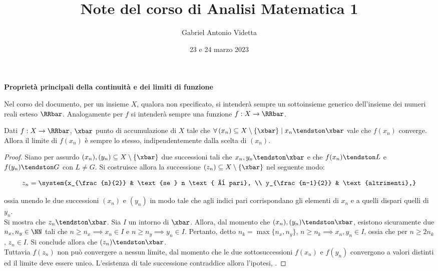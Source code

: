 \documentclass[11pt]{article}
\title{\textbf{Note del corso di Analisi Matematica 1}}
\author{Gabriel Antonio Videtta}
\date{23 e 24 marzo 2023}
\begin{document}
	
	\maketitle
	
	\begin{center}
		\Large \textbf{Proprietà principali della continuità e dei limiti di funzione}
	\end{center}
	
	\begin{note} Nel corso del documento, per un insieme $X$, qualora non
		specificato, si intenderà sempre un sottoinsieme generico dell'insieme
		dei numeri reali esteso $\RRbar$. Analogamente per $f$ si intenderà
		sempre una funzione $f : X \to \RRbar$.
	\end{note}
	
	\begin{proposition}
		Dati $f : X \to \RRbar$, $\xbar$ punto di accumulazione di $X$
		tale che $\forall \, (x_n) \subseteq X \setminus \{\xbar\} \mid x_n \tendston \xbar$ vale che
		$f(x_n)$ converge. Allora il limite di $f(x_n)$ è sempre lo stesso, indipendentemente
		dalla scelta di $(x_n)$.
	\end{proposition}

	\begin{proof}
		Siano per assurdo $(x_n), (y_n) \subseteq X \setminus \{\xbar\}$ due successioni tali che
		$x_n, y_n \tendston \xbar$ e che $f(x_n) \tendston L$ e $f(y_n) \tendston G$ con $L \neq G$. Si
		costruisce allora la successione $(z_n) \subseteq X \setminus \{\xbar\}$ nel seguente modo:
		
		\[ z_n = \system{x_{\frac{n}{2}} & \text{se } n \text{ è pari}, \\ y_{\frac{n-1}{2}} & \text{altrimenti},} \]
		
		\vskip 0.05in
		
		ossia unendo le due successioni $(x_n)$ e $(y_n)$ in modo tale che agli indici pari corrispondano gli
		elementi di $x_n$ e a quelli dispari quelli di $y_n$. \\
		
		Si mostra che $z_n \tendston \xbar$. Sia $I$ un intorno di $\xbar$. Allora, dal momento che
		$(x_n), (y_n) \tendston \xbar$, esistono sicuramente due
		$n_x, n_y \in \NN$ tali che $n \geq n_x \implies x_n \in I$ e $n \geq n_y \implies y_n \in I$. Pertanto,
		detto $n_k = \max\{n_x, n_y\}$, $n \geq n_k \implies x_n, y_n \in I$, ossia che per $n \geq 2 n_k$,
		$z_n \in I$. Si conclude allora che $(z_n) \tendston \xbar$. \\
		
		Tuttavia $f(z_n)$ non può convergere a nessun limite, dal momento che le due sottosuccessioni
		$f(x_n)$ e $f(y_n)$ convergono a valori distinti ed il limite deve essere unico. L'esistenza di
		tale successione contraddice allora l'ipotesi, \Lightning.
	\end{proof}
\end{document}
